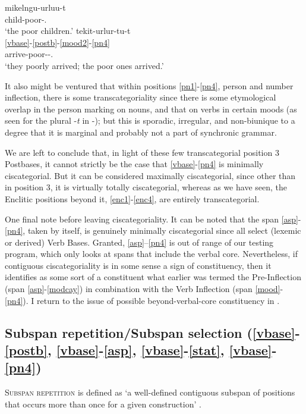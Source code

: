 \documentclass[output=paper]{langscibook}
\begin{document}
\ea\label{ex:key:32}
\ea\label{ex:key:32a}
\gll mikelngu-urluu-t\\
     child-poor-\Abs.\Pl{}\\
\glt `the poor children.'
\ex\label{ex:key:32b}
\glll tekit-urlur-tu-t\\
    \ref{vbase}-\ref{postb}-\ref{mood2}-\ref{pn4} \\
     arrive-poor-\Ind{}-\Tpl.\Sarg{}\\
\glt `they poorly arrived; the poor ones arrived.'
\z
\z

It also might be ventured that within positions \ref{pn1}-\ref{pn4}, person and number inflection, there is some transcategoriality since there is some etymological overlap in the person marking on nouns, and that on verbs in certain moods (as seen for the plural -\textit{t} in -); but this is sporadic, irregular, and non-biunique to a degree that it is marginal and probably not a part of synchronic grammar.

We are left to conclude that, in light of these few transcategorial position 3 Postbases, it cannot strictly be the case that \ref{vbase}-\ref{pn4} is minimally ciscategorial. But it can be considered maximally ciscategorial, since other than in position 3, it is virtually totally ciscategorial, whereas as we have seen, the Enclitic positions beyond it, \ref{enc1}-\ref{enc4}, are entirely transcategorial.

One final note before leaving ciscategoriality. It can be noted that the span \ref{asp}-\ref{pn4}, taken by itself, is genuinely minimally ciscategorial since all select (lexemic or derived) Verb Bases. Granted, \ref{asp}--\ref{pn4} is out of range of our testing program, which only looks at spans that include the verbal core. Nevertheless, if contiguous ciscategoriality is in some sense a sign of constituency, then it identifies as some sort of a constituent what earlier was termed the Pre-Inflection (span \ref{asp}-\ref{modcay}) in combination with the Verb Inflection (span \ref{mood}-\ref{pn4}). I return to the issue of possible beyond-verbal-core constituency in .


\subsection{Subspan repetition/Subspan selection (\ref{vbase}-\ref{postb}, \ref{vbase}-\ref{asp}, \ref{vbase}-\ref{stat}, \ref{vbase}-\ref{pn4})} 
\label{sec:5.6}

\textsc{Subspan} \textsc{repetition} is defined as `a well-defined contiguous subspan of positions that occurs more than once for a given construction' \citep[16]{Tallman2021}.
\end{document}
